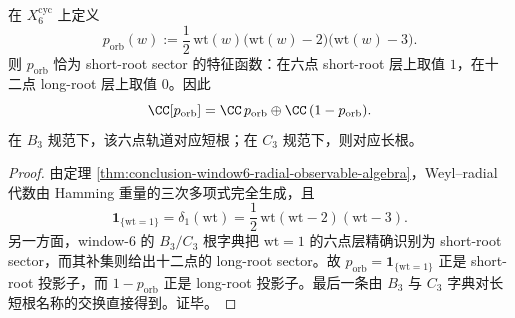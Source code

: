 \begin{corollary}\label{cor:conclusion-window6-cyclic-cubic-weyl-projector}
在 \(X_6^{\mathrm{cyc}}\) 上定义
\[
p_{\mathrm{orb}}(w):=
\frac12\,\mathrm{wt}(w)\bigl(\mathrm{wt}(w)-2\bigr)\bigl(\mathrm{wt}(w)-3\bigr).
\]
则 \(p_{\mathrm{orb}}\) 恰为 short-root sector 的特征函数：在六点 short-root 层上取值 \(1\)，在十二点 long-root 层上取值 \(0\)。因此
\[
\CC[p_{\mathrm{orb}}]
=
\CC\,p_{\mathrm{orb}}\oplus \CC\,(1-p_{\mathrm{orb}}).
\]
在 \(B_3\) 规范下，该六点轨道对应短根；在 \(C_3\) 规范下，则对应长根。
\end{corollary}
\begin{proof}
由定理 \ref{thm:conclusion-window6-radial-observable-algebra}，Weyl--radial 代数由 Hamming 重量的三次多项式完全生成，且
\[
\mathbf 1_{\{\mathrm{wt}=1\}}
=
\delta_1(\mathrm{wt})
=
\frac12\,\mathrm{wt}(\mathrm{wt}-2)(\mathrm{wt}-3).
\]
另一方面，window-\(6\) 的 \(B_3/C_3\) 根字典把 \(\mathrm{wt}=1\) 的六点层精确识别为 short-root sector，而其补集则给出十二点的 long-root sector。故 \(p_{\mathrm{orb}}=\mathbf 1_{\{\mathrm{wt}=1\}}\) 正是 short-root 投影子，而 \(1-p_{\mathrm{orb}}\) 正是 long-root 投影子。最后一条由 \(B_3\) 与 \(C_3\) 字典对长短根名称的交换直接得到。证毕。
\end{proof}


